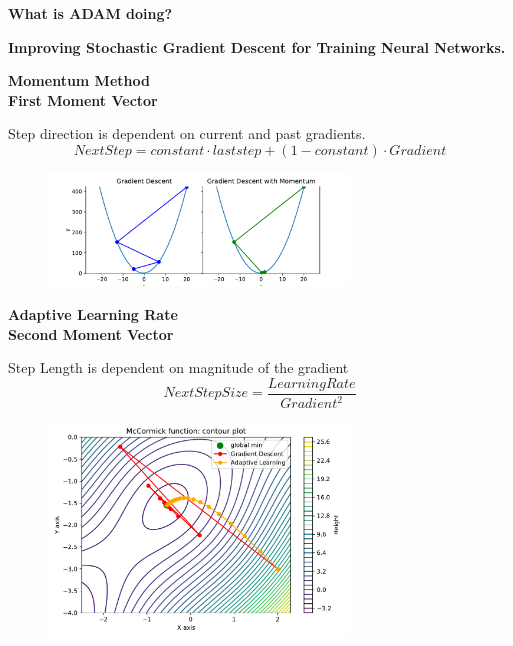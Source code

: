 \documentclass{beamer}
\newcommand\myheading[1]{%
  \par\bigskip
  {\Large\bfseries#1}\par\smallskip}
\begin{document}
\begin{frame}
    \myheading{What is ADAM doing?}
\end{frame}
\begin{frame}
    \myheading{Improving Stochastic Gradient Descent for Training Neural Networks.}
\end{frame}


\begin{frame}
    \myheading{Momentum Method\\First Moment Vector}
    Step direction is dependent on current and past gradients.
    $$Next Step = constant \cdot last step + (1-constant) \cdot Gradient$$
    
    \begin{figure}[h]
        \includegraphics[width=8cm]{report/figures/GD_momentum.pdf}
    \end{figure}
\end{frame}


\begin{frame}
    \myheading{Adaptive Learning Rate\\Second Moment Vector}
    Step Length is dependent on magnitude of the gradient
    $$NextStepSize = \frac{LearningRate}{Gradient^2} $$
    
    \begin{figure}[h]
        \includegraphics[width=8cm]{report/figures/GD_rmsprop.pdf}
    \end{figure}
\end{frame}
\end{document}
